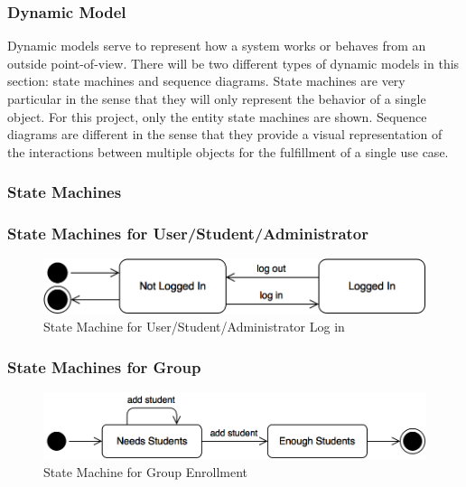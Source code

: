 \documentclass[12pt,letterpaper]{article}
\begin{document}
\subsubsection{Dynamic Model}

Dynamic models serve to represent how a system works or behaves from an outside point-of-view. There will be two different types of dynamic
models in this section: state machines and sequence diagrams. State machines are very particular in the sense that they will only represent the 
behavior of a single object. For this project, only the entity state machines are shown. Sequence diagrams are different in the sense that they
provide a visual representation of the interactions between multiple objects for the fulfillment of a single use case.

\subsubsection*{State Machines}

\subsubsection*{State Machines for User/Student/Administrator}

\begin{figure}[H]
	\centering{}
	\includegraphics[scale=0.3]{imgs/state/user-log-in.png}
	\caption{State Machine for User/Student/Administrator Log in}
\end{figure}

\subsubsection*{State Machines for Group}

\begin{figure}[H]
	\centering{}
	\includegraphics[scale=0.3]{imgs/state/group-enrollment.png}
	\caption{State Machine for Group Enrollment}
\end{figure}
\end{document}
